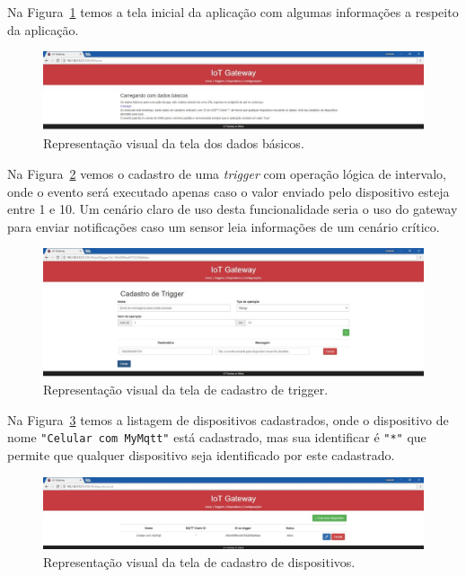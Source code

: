 Na Figura~\ref{fig:dadosBasicos} temos a tela inicial da aplicação com algumas informações a respeito da aplicação.
\begin{figure}[h!]
	\begin{center}
		\includegraphics[width=1.085\textwidth]{./img/dadosBasicos}
		\caption{Representação visual da tela dos dados básicos.}
		\label{fig:dadosBasicos}
	\end{center}
\end{figure}

Na Figura~\ref{fig:triggerCadastrada} vemos o cadastro de uma \textit{trigger} com operação lógica de intervalo, onde o evento será executado apenas caso o valor enviado pelo dispositivo esteja entre 1 e 10. Um cenário claro de uso desta funcionalidade seria o uso do gateway para enviar notificações caso um sensor leia informações de um cenário crítico.
\begin{figure}[h!]
	\begin{center}
		\includegraphics[width=1.085\textwidth]{./img/triggerCadastrada}
		\caption{Representação visual da tela de cadastro de trigger.}
		\label{fig:triggerCadastrada}
	\end{center}
\end{figure}

Na Figura~\ref{fig:dispositivoCadastrado} temos a listagem de dispositivos cadastrados, onde o dispositivo de nome \verb|"Celular com MyMqtt"| está cadastrado, mas sua identificar é \verb|"*"| que permite que qualquer dispositivo seja identificado por este cadastrado.
\begin{figure}[h!]
	\begin{center}
		\includegraphics[width=1.085\textwidth]{./img/dispositivoCadastrado}
		\caption{Representação visual da tela de cadastro de dispositivos.}
		\label{fig:dispositivoCadastrado}
	\end{center}
\end{figure}

